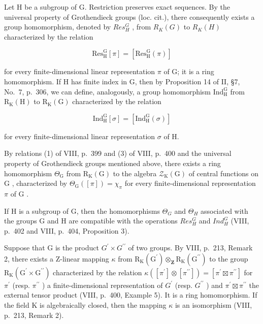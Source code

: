 Let H be a subgroup of G. Restriction preserves exact sequences. By the universal property of Grothendieck groups (loc. cit.), there consequently exists a group homomorphism, denoted by \(Res_{H}^{G}\) , from \(R_{K}(G)\) to \(R_{K}(H)\) characterized by the relation

\[
\mathrm{Res} _ {\mathrm{H}} ^ {\mathrm{G}} [ \pi ] = [ \mathrm{Res} _ {\mathrm{H}} ^ {\mathrm{G}} (\pi) ]\tag{6}
\]

for every finite-dimensional linear representation \(\pi\) of G; it is a ring homomorphism. If H has finite index in G, then by Proposition 14 of II, §7, No.~7, p.~306, we can define, analogously, a group homomorphism \(\mathrm{Ind}_{\mathrm{H}}^{\mathrm{G}}\) from \(\mathrm{R}_{\mathrm{K}}(\mathrm{H})\) to \(\mathrm{R}_{\mathrm{K}}(\mathrm{G})\) characterized by the relation

\[
\mathrm{Ind} _ {\mathrm{H}} ^ {\mathrm{G}} [ \sigma ] = [ \mathrm{Ind} _ {\mathrm{H}} ^ {\mathrm{G}} (\sigma) ]\tag{7}
\]

for every finite-dimensional linear representation \(\sigma\) of H.

By relations (1) of VIII, p.~399 and (3) of VIII, p.~400 and the universal property of Grothendieck groups mentioned above, there exists a ring homomorphism \(\Theta_{\mathrm{G}}\) from \(\mathrm{R}_{\mathrm{K}}(\mathrm{G})\) to the algebra \(\mathcal{Z}_{\mathrm{K}}(\mathrm{G})\) of central functions on \(\mathrm{G}\) , characterized by \(\Theta_{\mathrm{G}}([\pi]) = \chi_{\pi}\) for every finite-dimensional representation \(\pi\) of \(\mathrm{G}\) .

If H is a subgroup of G, then the homomorphisms \(\Theta_{G}\) and \(\Theta_{H}\) associated with the groups G and H are compatible with the operations \(Res_{H}^{G}\) and \(Ind_{H}^{G}\) (VIII, p.~402 and VIII, p.~404, Proposition 3).

Suppose that G is the product \(G^{\prime} \times G^{\prime\prime}\) of two groups. By VIII, p.~213, Remark 2, there exists a Z-linear mapping \(\kappa\) from \(\mathrm{R}_{\mathrm{K}}(\mathrm{G}^{\prime}) \otimes_{\mathbf{Z}} \mathrm{R}_{\mathrm{K}}(\mathrm{G}^{\prime\prime})\) to the group \(\mathrm{R}_{\mathrm{K}}(\mathrm{G}^{\prime} \times \mathrm{G}^{\prime\prime})\) characterized by the relation \(\kappa([\pi^{\prime}] \otimes [\pi^{\prime\prime}]) = [\pi^{\prime} \boxtimes \pi^{\prime\prime}]\) for \(\pi^{\prime}\) (resp. \(\pi^{\prime\prime}\) ) a finite-dimensional representation of \(G^{\prime}\) (resp. \(G^{\prime\prime}\) ) and \(\pi^{\prime} \boxtimes \pi^{\prime\prime}\) the external tensor product (VIII, p.~400, Example 5). It is a ring homomorphism. If the field K is algebraically closed, then the mapping \(\kappa\) is an isomorphism (VIII, p.~213, Remark 2).


